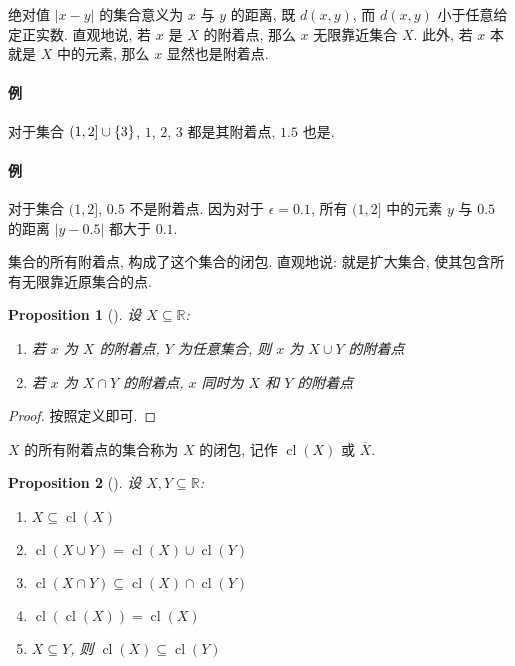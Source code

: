 \documentclass[UTF8]{ctexart}
\theoremstyle{mystyle}
\newtheorem{proposition}{Proposition}[section]
\theoremstyle{myremark}
\theoremstyle{plain}
\newcommand{\R}{\mathbb R}
\DeclarePairedDelimiter\set{\{}{\}}
\DeclareMathOperator{\cl}{cl}
\begin{document}
绝对值 $ |x - y| $ 的集合意义为 $ x $ 与 $ y $ 的距离, 既 $ d(x, y) $, 而 $ d(x, y) $ 小于任意给定正实数. 直观地说, 若 $ x $ 是 $ X $ 的附着点, 那么 $ x $ 无限靠近集合 $ X $. 此外, 若 $ x $ 本就是 $ X $ 中的元素, 那么 $ x $ 显然也是附着点.

\paragraph{例}
对于集合 $ (1, 2] \cup \set{3} $, $ 1 $, $ 2 $, $ 3 $ 都是其附着点, $ 1.5 $ 也是.

\paragraph{例}
对于集合 $ (1, 2] $, $ 0.5 $ 不是附着点. 因为对于 $ \epsilon = 0.1 $, 所有 $ (1, 2] $ 中的元素 $ y $ 与 $ 0.5 $ 的距离 $ |y - 0.5| $ 都大于 $ 0.1 $.

集合的所有附着点, 构成了这个集合的闭包. 直观地说: 就是扩大集合, 使其包含所有无限靠近原集合的点.

\begin{proposition}[] 设 $ X \subseteq \R $:
    \begin{enumerate}
        \item 若 $ x $ 为 $ X $ 的附着点, $ Y $ 为任意集合, 则 $ x $ 为 $ X \cup Y $ 的附着点
        \item 若 $ x $ 为 $ X \cap Y $ 的附着点, $ x $ 同时为 $ X $ 和 $ Y $ 的附着点
    \end{enumerate}
\end{proposition}

\begin{proof}
    按照定义即可.
\end{proof}

\begin{definition}
    $ X $ 的所有附着点的集合称为 $ X $ 的闭包, 记作 $ \cl (X) $ 或 $ \overline X $.
\end{definition}

\begin{proposition}[] 设 $ X, Y \subseteq \R $:
    \begin{enumerate}
        \item $ X \subseteq \cl (X) $
        \item $ \cl (X \cup Y) = \cl (X) \cup \cl (Y) $
        \item $ \cl (X \cap Y) \subseteq \cl (X) \cap \cl (Y) $
        \item $ \cl (\cl (X)) = \cl (X) $
        \item $ X \subseteq Y $, 则 $ \cl (X) \subseteq \cl (Y) $
    \end{enumerate}
\end{proposition}
\end{document}
